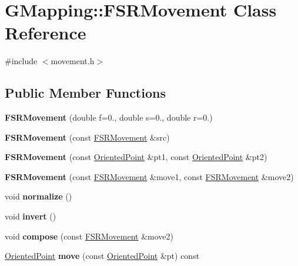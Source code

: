 \hypertarget{classGMapping_1_1FSRMovement}{}\section{G\+Mapping\+:\+:F\+S\+R\+Movement Class Reference}
\label{classGMapping_1_1FSRMovement}


{\ttfamily \#include $<$movement.\+h$>$}

\subsection*{Public Member Functions}
\begin{DoxyCompactItemize}
\item 
\mbox{\label{classGMapping_1_1FSRMovement_a6bc88fa47a97a0fcfe9d518e721ce00b}} 
{\bfseries F\+S\+R\+Movement} (double f=0., double s=0., double r=0.)
\item 
\mbox{\label{classGMapping_1_1FSRMovement_ad6e28fd681adc361c370f12216da885c}} 
{\bfseries F\+S\+R\+Movement} (const \hyperlink{classGMapping_1_1FSRMovement}{F\+S\+R\+Movement} \&src)
\item 
\mbox{\label{classGMapping_1_1FSRMovement_af3e5524c774aaf1d31b0165a97651cc9}} 
{\bfseries F\+S\+R\+Movement} (const \hyperlink{structGMapping_1_1orientedpoint}{Oriented\+Point} \&pt1, const \hyperlink{structGMapping_1_1orientedpoint}{Oriented\+Point} \&pt2)
\item 
\mbox{\label{classGMapping_1_1FSRMovement_a00d21267977d64578cd2b3ccba847c32}} 
{\bfseries F\+S\+R\+Movement} (const \hyperlink{classGMapping_1_1FSRMovement}{F\+S\+R\+Movement} \&move1, const \hyperlink{classGMapping_1_1FSRMovement}{F\+S\+R\+Movement} \&move2)
\item 
\mbox{\label{classGMapping_1_1FSRMovement_a9ce813f06bddde097697b00adeb51db1}} 
void {\bfseries normalize} ()
\item 
\mbox{\label{classGMapping_1_1FSRMovement_a628f03b23fc66b36e45e770a2aa8cff6}} 
void {\bfseries invert} ()
\item 
\mbox{\label{classGMapping_1_1FSRMovement_aadb5a27fce9ad65ca94ef8925d12691e}} 
void {\bfseries compose} (const \hyperlink{classGMapping_1_1FSRMovement}{F\+S\+R\+Movement} \&move2)
\item 
\mbox{\label{classGMapping_1_1FSRMovement_a2b4290a239c002e487c1035bae321c4a}} 
\hyperlink{structGMapping_1_1orientedpoint}{Oriented\+Point} {\bfseries move} (const \hyperlink{structGMapping_1_1orientedpoint}{Oriented\+Point} \&pt) const
\end{DoxyCompactItemize}

